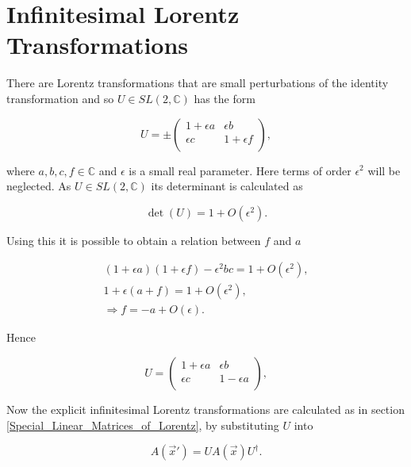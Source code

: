 \section{Infinitesimal Lorentz Transformations}

There are Lorentz transformations that are small perturbations of the identity transformation and so $U \in SL(2,\mathbb{C})$ has the form

\begin{equation}\label{Infinitesimal_Infinitesimal_Lorentz_Transform_Matrix_U}
U = \pm
\left(
\begin{array}{cc}
1 + \epsilon a & \epsilon b \\
\epsilon c & 1 + \epsilon f \\
\end{array}
\right),
\end{equation}

\noindent where $a,b,c,f \in \mathbb{C}$ and $\epsilon$ is a small real parameter. Here terms of order $\epsilon^2$ will be neglected. As $U \in SL(2,\mathbb{C})$ its determinant is calculated as

\begin{equation*}
\det{(U)} = 1 + O(\epsilon^2).
\end{equation*}

\noindent Using this it is possible to obtain a relation between $f$ and $a$

\begin{eqnarray*}
(1 + \epsilon a)(1 + \epsilon f) - \epsilon^2 b c = 1 + O(\epsilon^2), \\
1 + \epsilon (a +f) = 1 + O(\epsilon^2), \\
\Rightarrow f = -a + O(\epsilon).
\end{eqnarray*}

\noindent Hence 

\begin{equation*}
U =
\left(
\begin{array}{cc}
1 + \epsilon a & \epsilon b \\
\epsilon c & 1 - \epsilon a \\
\end{array}
\right),
\end{equation*}

Now the explicit infinitesimal Lorentz transformations are calculated as in section \ref{Special_Linear_Matrices_of_Lorentz}, by substituting $U$ into

\begin{equation*}
A(\vec{x}') = U A(\vec{x}) U^{\dagger}.
\end{equation*}

